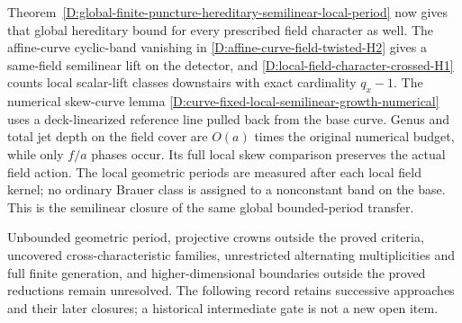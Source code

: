 Theorem~\ref{D:global-finite-puncture-hereditary-semilinear-local-period}
now gives that global hereditary bound for every prescribed field
character as well. The affine-curve cyclic-band vanishing in
\ref{D:affine-curve-field-twisted-H2} gives a same-field semilinear
lift on the detector, and
\ref{D:local-field-character-crossed-H1} counts local scalar-lift
classes downstairs with exact cardinality $q_x-1$.
The numerical skew-curve lemma
\ref{D:curve-fixed-local-semilinear-growth-numerical} uses a
deck-linearized reference line pulled back from the base curve.
Genus and total jet depth on the field cover are $O(a)$ times
the original numerical budget, while only $f/a$ phases occur.
Its full local skew comparison preserves the actual field action.
The local geometric periods are measured after each local field
kernel; no ordinary Brauer class is assigned to a nonconstant
band on the base. This is the semilinear closure of the same
global bounded-period transfer.

Unbounded geometric period, projective crowns outside the proved
criteria, uncovered cross-characteristic families, unrestricted
alternating multiplicities and full finite generation, and
higher-dimensional boundaries outside the proved reductions
remain unresolved. The following record retains successive
approaches and their later closures; a historical intermediate
gate is not a new open item.

